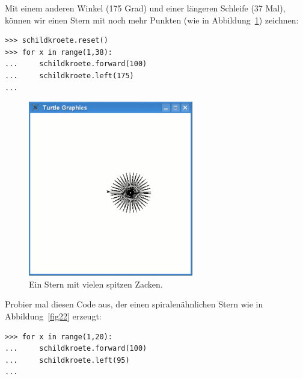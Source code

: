 \noindent
Mit einem anderen Winkel (175 Grad) und einer längeren Schleife (37 Mal), können wir einen Stern mit noch mehr Punkten (wie in Abbildung~\ref{fig21}) zeichnen:

\begin{Verbatim}[frame=single]
>>> schildkroete.reset()
>>> for x in range(1,38):
...     schildkroete.forward(100)
...     schildkroete.left(175)
...
\end{Verbatim}

\begin{figure}
\begin{center}
\includegraphics[width=72mm]{images/figure21}
\end{center}
\caption{Ein Stern mit vielen spitzen Zacken.}\label{fig21}
\end{figure}

\noindent
Probier mal diesen Code aus, der einen spiralenähnlichen Stern wie in Abbildung~\ref{fig22} erzeugt:

\begin{Verbatim}[frame=single]
>>> for x in range(1,20):
...     schildkroete.forward(100)
...     schildkroete.left(95)
...
\end{Verbatim}

